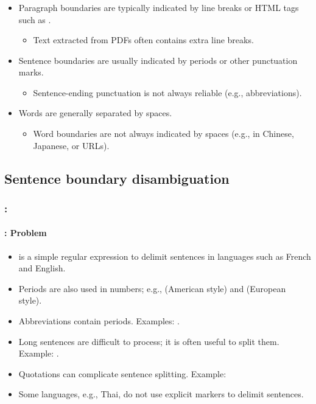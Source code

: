 \documentclass[xcolor=table]{beamer}
\begin{document}
\begin{frame}
	\frametitle{\insertshortsubtitle}
	\framesubtitle{\insertsection}
	
	\begin{itemize}
		\item Paragraph boundaries are typically indicated by line breaks or HTML tags such as .
		\begin{itemize}
			\item Text extracted from PDFs often contains extra line breaks. 
		\end{itemize}
		\item Sentence boundaries are usually indicated by periods or other punctuation marks.
		\begin{itemize}
			\item Sentence-ending punctuation is not always reliable (e.g., abbreviations). 
		\end{itemize}
		\item Words are generally separated by spaces.
		\begin{itemize}
			\item Word boundaries are not always indicated by spaces (e.g., in Chinese, Japanese, or URLs).
		\end{itemize}
	\end{itemize}
	
\end{frame}


\subsection{Sentence boundary disambiguation}

\begin{frame}
	\frametitle{\insertshortsubtitle: \insertsection}
	\framesubtitle{\insertsubsection: Problem} 
	
	\begin{itemize}
		\item \expword{/[.?!]/} is a simple regular expression to delimit sentences in languages such as French and English.
		\item Periods are also used in numbers; e.g.,  (American style) and  (European style).
		\item Abbreviations contain periods. Examples: .
		\item Long sentences are difficult to process; it is often useful to split them. Example: .
		\item Quotations can complicate sentence splitting. Example: 
		\item Some languages, e.g., Thai, do not use explicit markers to delimit sentences.
	\end{itemize}

\end{frame}
\end{document}
